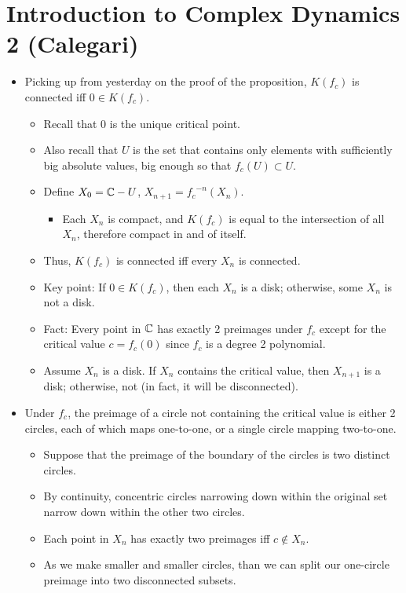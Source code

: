 \documentclass[../main.tex]{subfiles}
\begin{document}
\section{Introduction to Complex Dynamics 2 (Calegari)}
\begin{itemize}
    \item {}Picking up from yesterday on the proof of the proposition, $K(f_c)$ is connected iff $0\in K(f_c)$.
    \begin{itemize}
        \item Recall that 0 is the unique critical point.
        \item Also recall that $U$ is the set that contains only elements with sufficiently big absolute values, big enough so that $f_c(U)\subset U$.
        \item Define $X_0=\mathbb{C}-U$, $X_{n+1}={f_c}^{-n}(X_n)$.
        \begin{itemize}
            \item Each $X_n$ is compact, and $K(f_c)$ is equal to the intersection of all $X_n$, therefore compact in and of itself.
        \end{itemize}
        \item Thus, $K(f_c)$ is connected iff every $X_n$ is connected.
        \item Key point: If $0\in K(f_c)$, then each $X_n$ is a disk; otherwise, some $X_n$ is not a disk.
        \item Fact: Every point in $\mathbb{C}$ has exactly 2 preimages under $f_c$ except for the critical value $c=f_c(0)$ since $f_c$ is a degree 2 polynomial.
        \item Assume $X_n$ is a disk. If $X_n$ contains the critical value, then $X_{n+1}$ is a disk; otherwise, not (in fact, it will be disconnected).
    \end{itemize}
    \item Under $f_c$, the preimage of a circle not containing the critical value is either 2 circles, each of which maps one-to-one, or a single circle mapping two-to-one.
    \begin{itemize}
        \item Suppose that the preimage of the boundary of the circles is two distinct circles.
        \item By continuity, concentric circles narrowing down within the original set narrow down within the other two circles.
        \item Each point in $X_n$ has exactly two preimages iff $c\notin X_n$.
        \item As we make smaller and smaller circles, than we can split our one-circle preimage into two disconnected subsets.

\end{itemize}
\end{itemize}
\end{document}
